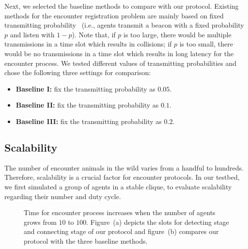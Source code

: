 Next, we selected the baseline methods to compare with our protocol. 
Existing methods for the encounter registration problem are mainly based on fixed transmitting 
probability~\cite{Menhill2012NovelTelemetry,Rutz2012AutomatedMapping}
(i.e., agents transmit a beacon with a fixed probability $p$ and listen with $1-p$).  
Note that, if $p$ is too large, there would be multiple transmissions in a time slot which results in 
collisions; if $p$ is too small, there would be no transmissions in a time slot which results 
in long latency for the encounter process.
We tested different values of transmitting probabilities and chose the following three settings for comparison: 
\begin{itemize}
    \item \textbf{Baseline I:} fix the transmitting probability as $0.05$. 
    \item \textbf{Baseline II:} fix the transmitting probability as $0.1$. 
    \item \textbf{Baseline III:} fix the transmitting probability as $0.2$. 
\end{itemize}


\subsection{Scalability}

The number of encounter animals in the wild varies from a handful to hundreds. 
Therefore, scalability is a crucial factor for encounter protocols. 
In our testbed, we first simulated a group of agents in a stable clique, to evaluate scalability 
regarding their number and duty cycle.

\begin{figure}[!h]
    \centering
    \hspace{0.01in}
    \caption{Time for encounter process increases when the number of agents grows from $10$ to $100$.
    Figure~(a) depicts the slots for detecting stage and connecting stage of our protocol and figure~(b)
    compares our protocol with the three baseline methods.}
    \label{fig_num}
\end{figure}

